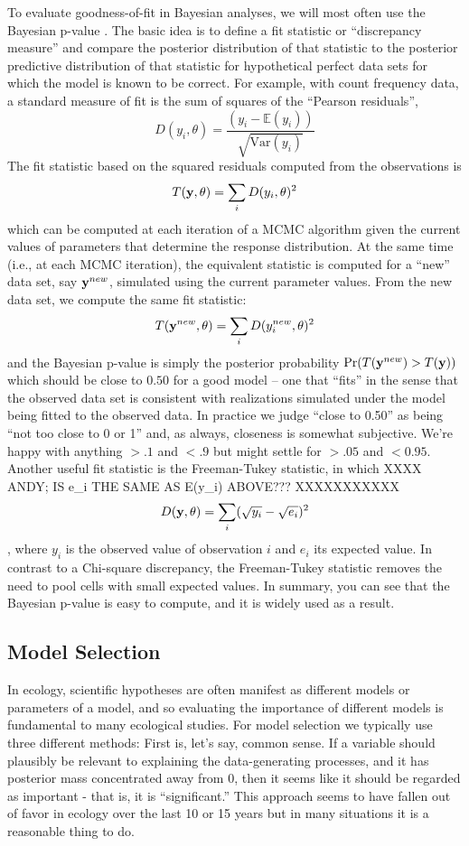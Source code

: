 {{{To evaluate goodness-of-fit in Bayesian analyses, we will most often
use the Bayesian p-value \citep{gelman_etal:1996}.  The basic idea is to define
a fit statistic or ``discrepancy measure'' and compare the posterior distribution of that
statistic to the posterior predictive distribution of that statistic
for hypothetical perfect data sets for which the model is known to be correct. For
example, with count frequency data, a standard measure of fit is the
sum of squares of the ``Pearson residuals'',
\[
D(y_i,\theta) = \frac{(y_i - \mathbb{E}(y_i))}{\sqrt{\mbox{Var}( y_{i} )}}
\]
The fit statistic based on the squared residuals computed from the
observations is 
\[
T({\bf y}, \theta) = \sum_{i} D(y_{i},\theta)^{2}
\]
which can be computed at each iteration of a MCMC algorithm given the
current values of parameters that determine the
 response distribution.  At the same time (i.e., at each MCMC
 iteration),
the equivalent statistic is computed for a
``new'' data set, say ${\bf y}^{new}$, 
simulated using the current parameter values. From the new data set,
we compute the same fit statistic:
\[
T({\bf y}^{new}, \theta) = \sum_{i} D(y_{i}^{new},\theta)^{2}
\]
and 
the
Bayesian p-value is simply the posterior probability $\Pr(T({\bf
  y}^{new})  >  T({\bf y}))$
 which should be close to $0.50$ for a good model -- one that
 ``fits'' in the sense that the observed data set is
 consistent with realizations simulated under the model being fitted
 to the observed data. In practice
we judge ``close to 0.50'' as being ``not too close to 0 or 1'' and,
as always, closeness is somewhat subjective. We're happy with anything
$>.1$ and $<.9$ but might settle for $>.05$ and $<0.95$. 
Another useful fit statistic is the Freeman-Tukey
statistic, in which
XXXX ANDY; IS e_i THE SAME AS E(y_i) ABOVE??? XXXXXXXXXXX
\[
D({\bf y},\theta) = \sum_{i} ( \sqrt{y_{i}} - \sqrt{e_{i}} )^2
\]
\citep{brooks_etal:2000}, where $y_{i}$ is the observed value of
observation $i$ and $e_{i}$ its expected value. In contrast to a
Chi-square discrepancy, the Freeman-Tukey statistic removes the need
to pool cells with small expected values.
In summary, you can see that 
the Bayesian p-value is easy to compute,
and it is widely used as a result.


\subsection{Model Selection }

In ecology, scientific hypotheses are often manifest as different models or parameters
 of a model, and so
evaluating the importance of different models is fundamental 
to many ecological studies.
For model selection we typically use three different methods: First
is, let's say, common sense. If a variable should plausibly be
relevant to explaining the data-generating processes, and it has 
 posterior mass
concentrated away from 0, then it seems like it should be regarded as
important - that is, it is ``significant.''  This approach seems to
have fallen out of favor in ecology over the last 10 or
15 years but in many situations it is a reasonable thing to do.

}}}

